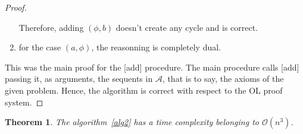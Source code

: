 \documentclass[a4paper, 11pt]{article}
\newtheorem{theorem}{Theorem}
\begin{document}
\begin{proof}
\begin{enumerate}
			    Therefore, adding $(\phi,b)$ doesn't create any cycle and is correct.
		    \item
			    for the case $(a,\phi)$, the reasonning is completely dual.
	    \end{enumerate}
	    This was the main proof for the [add] procedure. The main procedure calls [add] passing it,
	    as arguments, the sequents in $\mathcal{A}$, that is to say, the axioms of the given problem.
	    Hence, the algorithm is correct with respect to the OL proof system.
    \end{proof}

    \begin{theorem}
	    The algorithm~\ref{alg2} has a time complexity belonging to $\mathcal{O}(n^3)$.
    \end{theorem}
\end{document}
